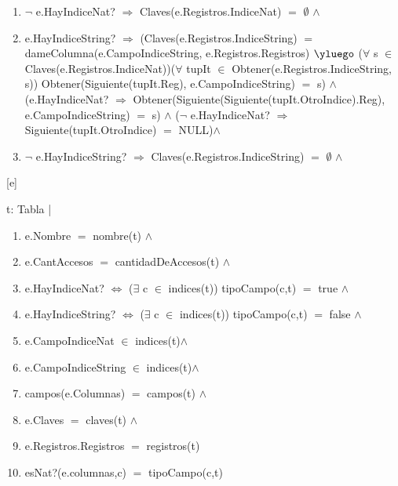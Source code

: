 \begin{Representacion}
{\begin{enumerate}
      \item $\neg$ e.HayIndiceNat? $\Rightarrow$ Claves(e.Registros.IndiceNat) $=$ $\emptyset $ $\land$
      \item e.HayIndiceString? $\Rightarrow$ (Claves(e.Registros.IndiceString) $=$ dameColumna(e.CampoIndiceString, e.Registros.Registros) $\yluego$ ($\forall$ s $\in$ Claves(e.Registros.IndiceNat))($\forall$ tupIt $\in$ Obtener(e.Registros.IndiceString, s)) Obtener(Siguiente(tupIt.Reg), e.CampoIndiceString) $=$ s) $\land$ (e.HayIndiceNat? $\Rightarrow$ Obtener(Siguiente(Siguiente(tupIt.OtroIndice).Reg), e.CampoIndiceString) $=$ s) $\land$ ($\neg$ e.HayIndiceNat? $\Rightarrow$ Siguiente(tupIt.OtroIndice) $=$ NULL)$\land$
      \item $\neg$ e.HayIndiceString? $\Rightarrow$ Claves(e.Registros.IndiceString) $=$ $\emptyset$ $\land$
      \end{enumerate}
    }
    

  [e]{t: Tabla | 
	\begin{enumerate}
		\item e.Nombre $=$ nombre(t) $\land$
        \item e.CantAccesos $=$ cantidadDeAccesos(t) $\land$
        \item e.HayIndiceNat? $\Leftrightarrow$ ($\exists$ c $\in$ indices(t)) tipoCampo(c,t) $=$ true $\land$
        \item e.HayIndiceString? $\Leftrightarrow$ ($\exists$ c $\in$ indices(t)) tipoCampo(c,t) $=$ false $\land$
        \item e.CampoIndiceNat $\in$ indices(t)$\land$
        \item e.CampoIndiceString $\in$ indices(t)$\land$
        \item campos(e.Columnas) $=$ campos(t) $\land$
        \item e.Claves $=$ claves(t) $\land$
        \item e.Registros.Registros $=$ registros(t)
        \item esNat?(e.columnas,c) $=$ tipoCampo(c,t)
	\end{enumerate} }
  
  ~


  ~
    
  
\end{Representacion}


